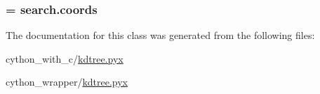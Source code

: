\label{classkdtree_1_1KDTreeNode_a1265f91aa61577e6ad09479e9ecdd026}
\hypertarget{classkdtree_1_1KDTreeNode_aa2687a8f932d2e8877b4a822e9510ac5}{
\subsubsection[{root}]{}}
\label{classkdtree_1_1KDTreeNode_aa2687a8f932d2e8877b4a822e9510ac5}
\hypertarget{classkdtree_1_1KDTreeNode_a0009221654e11a29a235b080a7fa80ed}{
\subsubsection[{search\_\-coords}]{ = search.coords}}
\label{classkdtree_1_1KDTreeNode_a0009221654e11a29a235b080a7fa80ed}


The documentation for this class was generated from the following files:\begin{DoxyCompactItemize}
\item 
cython\_\-with\_\-c/\hyperlink{cython__with__c_2kdtree_8pyx}{kdtree.pyx}\item 
cython\_\-wrapper/\hyperlink{cython__wrapper_2kdtree_8pyx}{kdtree.pyx}\end{DoxyCompactItemize}
